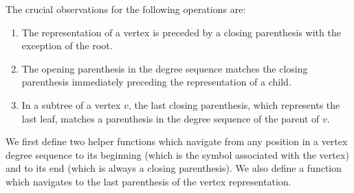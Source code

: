 \begin{algorithmic}
	\State {} 
\EndFunction
\end{algorithmic}

\begin{algorithmic}
	\State {} 
\EndFunction
\end{algorithmic}

The crucial observations for the following operations are:
\begin{enumerate}
	\item The representation of a vertex is preceded by a closing parenthesis with the exception of the root.
	\item The opening parenthesis in the degree sequence matches the closing parenthesis immediately preceding the representation of a child.
	\item In a subtree of a vertex $v$, the last closing parenthesis, which represents the last leaf, matches a parenthesis in the degree sequence of the parent of $v$.
\end{enumerate}

We first define two helper functions which navigate from any position in a vertex degree sequence to its beginning (which is the symbol associated with the vertex) and to its end (which is always a closing parenthesis).
We also define a function which navigates to the last parenthesis of the vertex representation.

\begin{algorithmic}
		\State {} 
		\State {} 
	\Else
		\State {}
	\EndIf
\EndFunction
\end{algorithmic}

\begin{algorithmic}
		\State {}
	\Else
		\State {}
	\EndIf
\EndFunction
\end{algorithmic}

\begin{algorithmic}
		\State {}
	\Else
		\State {}
	\EndIf
\EndFunction
\end{algorithmic}

